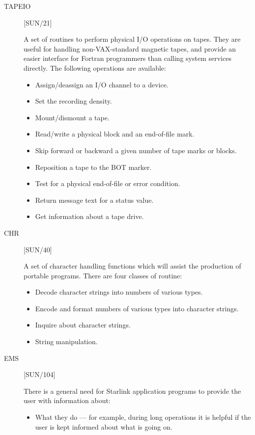 \begin{description}

\item [TAPEIO] \hfill [SUN/21]

A set of routines to perform physical I/O operations on tapes.
They are useful for handling non-VAX-standard magnetic tapes, and provide an
easier interface for Fortran programmers than calling system services directly.
The following operations are available:
\begin{itemize}
\item Assign/deassign an I/O channel to a device.
\item Set the recording density.
\item Mount/dismount a tape.
\item Read/write a physical block and an end-of-file mark.
\item Skip forward or backward a given number of tape marks or blocks.
\item Reposition a tape to the BOT marker.
\item Test for a physical end-of-file or error condition.
\item Return message text for a status value.
\item Get information about a tape drive.
\end{itemize}

\item [CHR] \hfill [SUN/40]

A set of character handling functions which will assist the production of
portable programs.
There are four classes of routine:
\begin{itemize}
\item Decode character strings into numbers of various types.
\item Encode and format numbers of various types into character strings.
\item Inquire about character strings.
\item String manipulation.
\end{itemize}

\item [EMS] \hfill [SUN/104]

There is a general need for Starlink application programs to provide the
user with information about:

\begin {itemize}
\item What they do --- for example, during long operations it is helpful if the
user is kept informed about what is going on.


\end{itemize}
\end{description}
